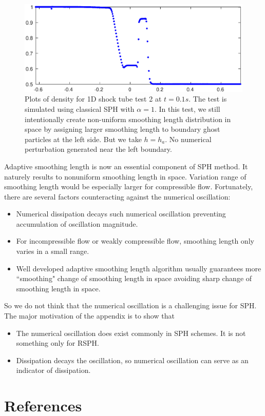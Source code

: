 \documentclass[preprint,12pt,authoryear]{elsarticle}
\begin{document}
\begin{figure}[H]
\centering
\includegraphics[width=0.90 \textwidth]{App-Figure/Perturbation-ME0-tp1}
\caption{Plots of density for 1D shock tube test 2 at $t=0.1s$. The test is simulated using classical SPH with $\alpha = 1$. In this test, we still intentionally create non-uniform smoothing length distribution in space by assigning larger smoothing length to boundary ghost particles at the left side. But we take $h=h_a$. No numerical perturbation generated near the left boundary.}    
\label{fig:Perturbation-ME0-tp1}
\end{figure}

Adaptive smoothing length is now an essential component of SPH method. It naturely results to nonuniform smoothing length in space. Variation range of smoothing length would be especially larger for compressible flow. Fortunately, there are several factors counteracting against the numerical oscillation:
\begin{itemize}
\item Numerical dissipation decays such numerical oscillation preventing accumulation of oscillation magnitude.
\item For incompressible flow or weakly compressible flow, smoothing length only varies in a small range.
\item Well developed adaptive smoothing length algorithm usually guarantees more ``smoothing" change of smoothing length in space avoiding sharp change of smoothing length in space.
\end{itemize}
So we do not think that the numerical oscillation is a challenging issue for SPH. The major motivation of the appendix is to show that 
\begin{itemize}
\item The numerical oscillation does exist commonly in SPH schemes. It is not something only for RSPH.
\item Dissipation decays the oscillation, so numerical oscillation can serve as an indicator of dissipation.
\end{itemize}
\section*{References}
  

\end{document}
